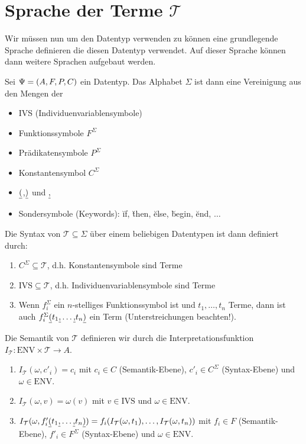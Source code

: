 \section{Sprache der Terme $\mathcal{T}$}
Wir müssen nun um den Datentyp verwenden zu können eine grundlegende Sprache 
definieren die diesen Datentyp verwendet. Auf dieser Sprache können dann weitere Sprachen
aufgebaut werden.
\begin{defn}
Sei $\Psi=\left(A,F,P,C\right)$ ein Datentyp.
Das Alphabet $\Sigma$ ist dann eine Vereinigung aus den Mengen der
\begin{itemize}
\item IVS (Individuenvariablensymbole)
\item Funktionssymbole $F^{\Sigma}$
\item Prädikatensymbole $P^{\Sigma}$
\item Konstantensymbol $C^{\Sigma}$
\item $\underline{(}$,$\underline{)}$ und $\underline{,}$
\item Sondersymbole (Keywords): \u{if}, \u{then}, \u{else}, \u{begin}, \u{end}, $\ldots$
\end{itemize}
Die Syntax von $\mathcal{T} \subseteq \Sigma$ über einem beliebigen Datentypen ist dann definiert durch:
\begin{enumerate}
\item $C^{\Sigma} \subseteq \mathcal{T}$, d.h. Konstantensymbole sind Terme
\item $\text{IVS} \subseteq \mathcal{T}$, d.h. Individuenvariablensymbole sind Terme
\item Wenn $f^{\Sigma}_i$ ein $n$-stelliges Funktionssymbol ist und $t_1,\ldots,t_n$ Terme,
dann ist auch $f^{\Sigma}_i\underline{(}t_1\underline{,}\ldots\underline{,}t_n\underline{)}$ ein Term (Unterstreichungen beachten!).
\end{enumerate}
Die Semantik von $\mathcal{T}$ definieren wir durch die Interpretationsfunktion $I_{\mathcal{T}}: \text{ENV} \times \mathcal{T} \to A$.
\begin{enumerate}
\item $I_{\mathcal{T}}(\omega,c'_i)=c_i$ mit $c_i \in C$ (Semantik-Ebene), $c'_i \in C^{\Sigma}$ (Syntax-Ebene) und $\omega \in \text{ENV}$.
\item $I_{\mathcal{T}}(\omega,v)=\omega(v)$ mit $v \in \text{IVS}$ und $\omega \in \text{ENV}$.
\item $I_{\mathcal{T}}(\omega,f'_i\underline{(}t_1\underline{,}\ldots\underline{,}t_n\underline{)})=f_i(I_{\mathcal{T}}(\omega,t_1),\ldots,I_{\mathcal{T}}(\omega,t_n))$ mit $f_i \in F$ (Semantik-Ebene), $f'_i \in F^{\Sigma}$ (Syntax-Ebene) und $\omega \in \text{ENV}$.
\end{enumerate}
\end{defn}

